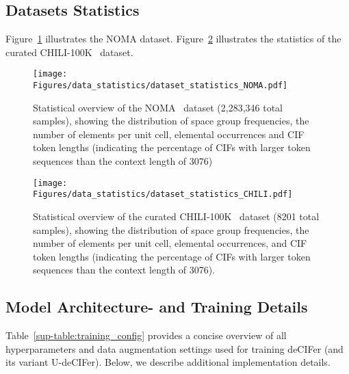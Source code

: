 \subsection{Datasets Statistics}

Figure~\ref{sup-fig:dataset_statistics_NOMA} illustrates the NOMA dataset. Figure~\ref{sup-fig:dataset_statistics_CHILI_100K} illustrates the statistics of the curated CHILI-100K~\cite{FriisJensenJohansen2024} dataset.

\begin{figure}[t!]
\vskip 0.2in
\begin{center}
\centerline{\texttt{[image: Figures/data\_statistics/dataset\_statistics\_NOMA.pdf]}}
\caption{Statistical overview of the NOMA~\cite{antunes2024crystalstructuregenerationautoregressive} dataset (2,283,346 total samples), showing the distribution of space group frequencies, the number of elements per unit cell, elemental occurrences and CIF token lengths (indicating the percentage of CIFs with larger token sequences than the context length of 3076)}
\label{sup-fig:dataset_statistics_NOMA}
\end{center}
\vskip -0.2in
\end{figure}

\begin{figure}[t!]
\vskip 0.2in
\begin{center}
\centerline{\texttt{[image: Figures/data\_statistics/dataset\_statistics\_CHILI.pdf]}}
\caption{Statistical overview of the curated CHILI-100K~\cite{FriisJensenJohansen2024} dataset (8201 total samples), showing the distribution of space group frequencies, the number of elements per unit cell, elemental occurrences, and CIF token lengths (indicating the percentage of CIFs with larger token sequences than the context length of 3076).}
\label{sup-fig:dataset_statistics_CHILI_100K}
\end{center}
\vskip -0.2in
\end{figure}

\subsection{Model Architecture- and Training Details}\label{sup-sec:model_architecture}

Table~\ref{sup-table:training_config} provides a concise overview of all hyperparameters and data augmentation settings used for training deCIFer (and its variant U-deCIFer). Below, we describe additional implementation details.

